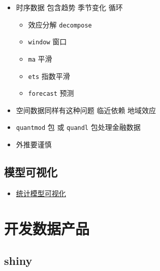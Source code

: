 \documentclass[]{book}
\providecommand{\tightlist}{%
  \setlength{\itemsep}{0pt}\setlength{\parskip}{0pt}}
\begin{document}
\begin{itemize}
\tightlist
\item
  时序数据 包含趋势 季节变化 循环

  \begin{itemize}
  \tightlist
  \item
    效应分解 \texttt{decompose}
  \item
    \texttt{window} 窗口
  \item
    \texttt{ma} 平滑
  \item
    \texttt{ets} 指数平滑
  \item
    \texttt{forecast} 预测
  \end{itemize}
\item
  空间数据同样有这种问题 临近依赖 地域效应
\item
  \texttt{quantmod} 包 或 \texttt{quandl} 包处理金融数据
\item
  外推要谨慎
\end{itemize}

\hypertarget{ux6a21ux578bux53efux89c6ux5316}{%
\section{模型可视化}\label{ux6a21ux578bux53efux89c6ux5316}}

\begin{itemize}
\tightlist
\item
  \href{http://mfviz.com/hierarchical-models/}{统计模型可视化}
\end{itemize}

\hypertarget{product}{%
\chapter{开发数据产品}\label{product}}

\hypertarget{shiny}{%
\section{shiny}\label{shiny}}
\end{document}
